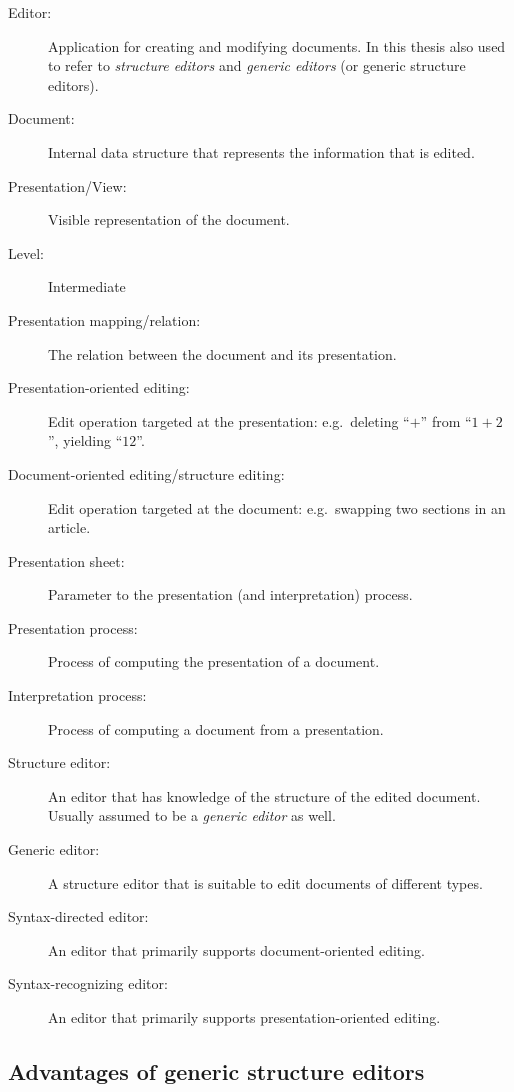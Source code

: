 \begin{description}
\item[Editor:] Application for creating and modifying documents. In this thesis also used to refer to {\em structure editors} and {\em generic editors} (or generic structure editors).
\item[Document:] Internal data structure that represents the information that is edited.
\item[Presentation/View:] Visible representation of the document.
\item[Level:] Intermediate  \todo{}
\item[Presentation mapping/relation:] The relation between the document and its presentation.
\item[Presentation-oriented editing:] Edit operation targeted at the presentation: e.g.\ deleting ``\;$+$\;'' from ``$1+2$'', yielding ``$12$''.
\item[Document-oriented editing/structure editing:] Edit operation targeted at the document: e.g.\ swapping two sections in an article.
\item[Presentation sheet:] Parameter to the presentation (and interpretation) process. 
\item[Presentation process:] Process of computing the presentation of a document.
\item[Interpretation process:] Process of computing a document from a presentation.
\item[Structure editor:] An editor that has knowledge of the structure of the edited document. Usually assumed to be a {\em generic editor} as well.
\item[Generic editor:] A structure editor that is suitable to edit documents of different types.
\item[Syntax-directed editor:] An editor that primarily supports document-oriented editing.
\item[Syntax-recognizing editor:] An editor that primarily supports presentation-oriented editing.
\end{description} 


%								
\subsection{Advantages of generic structure editors}

